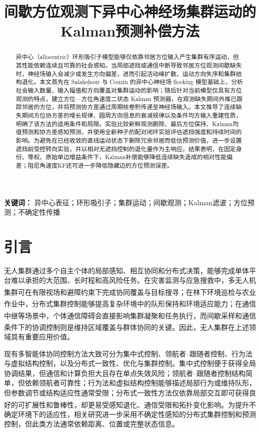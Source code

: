 \documentclass[UTF8,fontset=windows,11pt]{ctexart}
\title{\bfseries 间歇方位观测下异中心神经场集群运动的\newline Kalman预测补偿方法}
\author{}
\date{}
\newcommand{\upcite}[1]{\textsuperscript{\cite{#1}}}
\begin{document}
\maketitle

\begin{abstract}
异中心（allocentric）环形吸引子模型能够仅依靠邻居方位输入产生集群有序运动，但其性能依赖连续且可靠的社会感知。当局部遮挡或通信中断导致邻居方位观测间歇缺失时，神经场输入会减少或发生方向偏差，进而引起活动峰扩散、运动方向失序和集群结构退化。本文首先在 Salahshour 与 Couzin 的异中心神经场 flocking 模型基础上，分析社会输入数量、输入幅值和方向覆盖对集群运动的影响；随后针对当前模型仅具有方位观测的特点，建立方位—方位角速度二状态 Kalman 预测器，在观测缺失期间外推已跟踪邻居的方位，并将预测协方差通过周期核卷积传递至神经场输入。本文推导了连续缺失期间方位协方差的增长规律、圆周方向信息的衰减规律以及条件均方输入重建性质，明确了该方法的适用条件和局限。实验比较新鲜观测删除、最后方位保持、Kalman均值预测和协方差感知预测，并使用全新种子的配对闭环实验评估遮挡强度和持续时间的影响。为避免在已经收敛的直线运动状态下删除冗余邻居而低估预测价值，进一步设置遮挡前受控转向实验，并以相对无遮挡控制的退化量作为主响应。结果表明，在固定身份、等权、原始单边增益条件下，Kalman补偿能够降低连续缺失造成的相对性能偏差；阻尼角速度KF还可进一步降低隐藏边的方位预测误差。
\end{abstract}

\noindent\textbf{关键词：} 异中心表征；环形吸引子；集群运动；间歇观测；Kalman滤波；方位预测；不确定性传播

\section{引言}

无人集群通过多个自主个体的局部感知、相互协同和分布式决策，能够完成单体平台难以承担的大范围、长时程和高风险任务。在灾害监测与应急搜救中，多无人机集群可在有限视场和避障约束下完成协同覆盖与目标搜寻\upcite{Bai2024}；在林下环境巡检与农业作业中，分布式集群控制能够提高复杂环境中的队形保持和环境适应能力\upcite{Boldrer2026}；在通信中继等场景中，个体通信障碍会直接影响集群凝聚和任务执行\upcite{LiFlocking2024}，而间歇采样和通信条件下的协调控制则是维持区域覆盖与群体协同的关键\upcite{Ge2025Coordination}。因此，无人集群在上述领域具有重要应用价值。

现有多智能体协同控制方法大致可分为集中式控制、领航者--跟随者控制、行为法与虚拟结构控制，以及分布式一致性、优化与集群控制。集中式控制便于获得全局协调结果，但通信和计算负担大且存在单点失效风险；领航者--跟随者控制结构简单，但依赖领航者可靠性；行为法和虚拟结构控制能够描述局部行为或维持队形，但参数调节或结构适应性通常受限；分布式一致性方法仅依靠局部交互即可获得良好的可扩展性和鲁棒性\upcite{OlfatiSaber2006}，却更易受感知退化、通信受限和拓扑变化影响。为提升不确定环境下的适应性，相关研究进一步采用不确定性感知的分布式集群控制和预测控制，但此类方法通常依赖距离、位置或完整状态信息。
\end{document}
